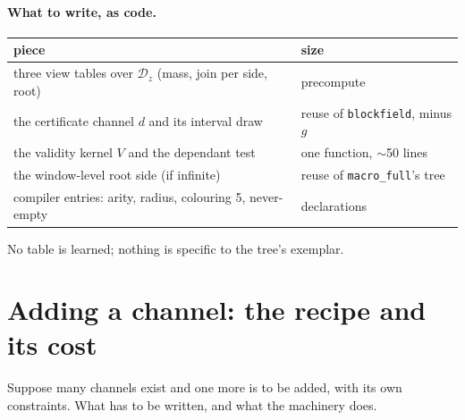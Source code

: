 \documentclass[11pt]{article}
\newcommand{\1}{\mathds{1}}
\newcommand{\Dom}{\mathcal{D}}
\begin{document}
\paragraph{What to write, as code.}
\begin{center}
\small
\begin{tabular}{@{}ll@{}}
\toprule
piece & size \\
\midrule
three view tables over $\Dom_z$ (mass, join per side, root) & precompute \\
the certificate channel $d$ and its interval draw & reuse of \texttt{blockfield}, minus $g$ \\
the validity kernel $V$ and the dependant test & one function, $\sim$50 lines \\
the window-level root side (if infinite) & reuse of \texttt{macro\_full}'s tree \\
compiler entries: arity, radius, colouring 5, never-empty & declarations \\
\bottomrule
\end{tabular}
\end{center}
No table is learned; nothing is specific to the tree's exemplar.

\section{Adding a channel: the recipe and its cost}
\label{sec:recipe}

Suppose many channels exist and one more is to be added, with its own
constraints. What has to be written, and what the machinery does.
\end{document}
